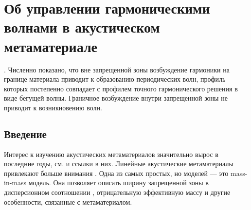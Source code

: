 \chapter{Об управлении гармоническими волнами в акустическом метаматериале}


. Численно показано, что вне запрещенной зоны возбуждение гармоники на границе материала приводит к образованию периодических волн, профиль которых постепенно совпадает с профилем точного гармонического решения в виде бегущей волны. Граничное возбуждение внутри запрещенной зоны не приводит к возникновению волн. 
  
\section{Введение}

Интерес к изучению акустических метаматериалов значительно вырос в последние годы, см. \cite{Cummer, Cvet, Huang2010, Ma, muller, delis1, Eremeyev2020, Porubov2019, Erofeev2020} и ссылки в них. Линейные акустические метаматериалы привлекают больше внимания \cite{Cvet, Huang2010, muller}. Одна из самых простых, но  моделей --- это mass-in-mass модель. Она позволяет описать ширину запрещенной зоны в дисперсионном соотношении \cite{Cvet, Huang2010}, отрицательную эффективную массу и другие особенности, связанные с метаматериалом. 

